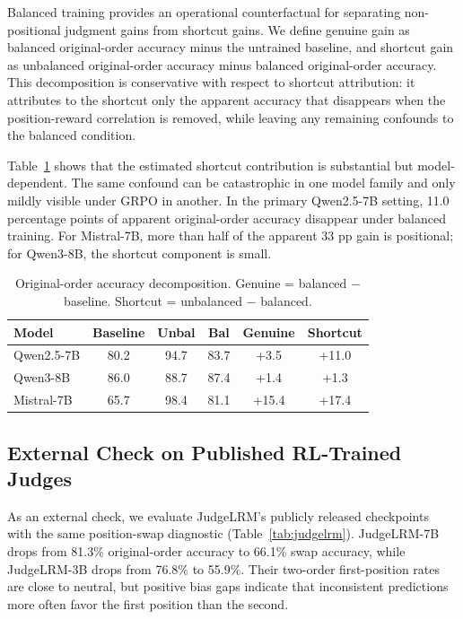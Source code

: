 \documentclass[letterpaper]{article}
\begin{document}
Balanced training provides an operational counterfactual for separating non-positional judgment gains from shortcut gains. We define genuine gain as balanced original-order accuracy minus the untrained baseline, and shortcut gain as unbalanced original-order accuracy minus balanced original-order accuracy. This decomposition is conservative with respect to shortcut attribution: it attributes to the shortcut only the apparent accuracy that disappears when the position-reward correlation is removed, while leaving any remaining confounds to the balanced condition.

Table~\ref{tab:decomposition} shows that the estimated shortcut contribution is substantial but model-dependent. The same confound can be catastrophic in one model family and only mildly visible under GRPO in another. In the primary Qwen2.5-7B setting, 11.0 percentage points of apparent original-order accuracy disappear under balanced training. For Mistral-7B, more than half of the apparent 33 pp gain is positional; for Qwen3-8B, the shortcut component is small.

\begin{table}[t]
\centering
\scriptsize
\begin{tabular}{lccccc}
\toprule
\textbf{Model} & \textbf{Baseline} & \textbf{Unbal} & \textbf{Bal} & \textbf{Genuine} & \textbf{Shortcut} \\
\midrule
Qwen2.5-7B & 80.2 & 94.7 & 83.7 & +3.5 & +11.0 \\
Qwen3-8B & 86.0 & 88.7 & 87.4 & +1.4 & +1.3 \\
Mistral-7B & 65.7 & 98.4 & 81.1 & +15.4 & +17.4 \\
\bottomrule
\end{tabular}
\caption{Original-order accuracy decomposition. Genuine = balanced $-$ baseline. Shortcut = unbalanced $-$ balanced.}
\label{tab:decomposition}
\end{table}

\subsection{External Check on Published RL-Trained Judges}

As an external check, we evaluate JudgeLRM's publicly released checkpoints~\citep{chen2025judgelrm} with the same position-swap diagnostic (Table~\ref{tab:judgelrm}). JudgeLRM-7B drops from 81.3\% original-order accuracy to 66.1\% swap accuracy, while JudgeLRM-3B drops from 76.8\% to 55.9\%. Their two-order first-position rates are close to neutral, but positive bias gaps indicate that inconsistent predictions more often favor the first position than the second.
\end{document}
